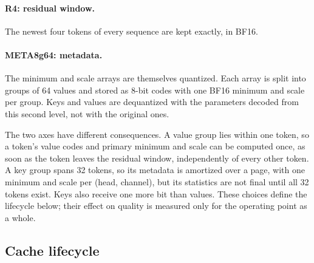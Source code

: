 \documentclass{article}
\begin{document}
\paragraph{R4: residual window.}
The newest four tokens of every sequence are kept exactly, in BF16.

\paragraph{META8g64: metadata.}
The minimum and scale arrays are themselves quantized. Each array is split into groups of 64 values and
stored as 8-bit codes with one BF16 minimum and scale per group. Keys and values are dequantized with
the parameters decoded from this second level, not with the original ones.

The two axes have different consequences. A value group lies within one token, so a token's value codes
and primary minimum and scale can be computed once, as soon as the token leaves the residual window,
independently of every other token.
A key group spans 32 tokens, so its metadata is amortized over a page, with one minimum and scale per
(head, channel), but its statistics are not final until all 32 tokens exist. Keys also receive one more
bit than values. These choices define the lifecycle below; their effect on quality is measured only for
the operating point as a whole.

\subsection{Cache lifecycle}
\end{document}
